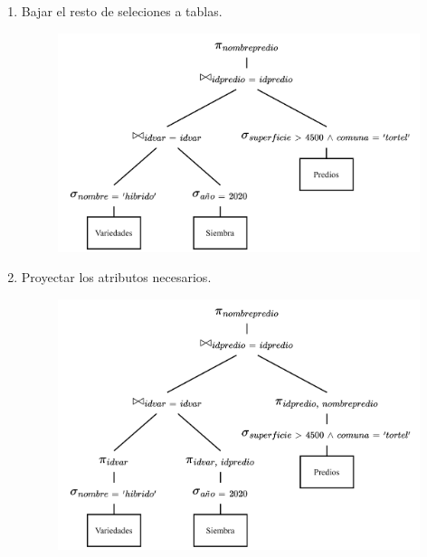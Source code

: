 \documentclass{templateNote}
\begin{document}
\begin{enumerate}
\begin{itemize}
\begin{enumerate}
            \item Bajar el resto de seleciones a tablas.
            \begin{figure}[H]
                \centering
                \includegraphics[width=\textwidth]{img/E2-Paso-5.png}
            \end{figure}

            \newpage
            \item Proyectar los atributos necesarios.
            \begin{figure}[H]
                \centering
                \includegraphics[width=\textwidth]{img/E2-Paso-6.png}
            \end{figure}
        \end{enumerate}
    \end{itemize}


\end{enumerate}
\end{document}
